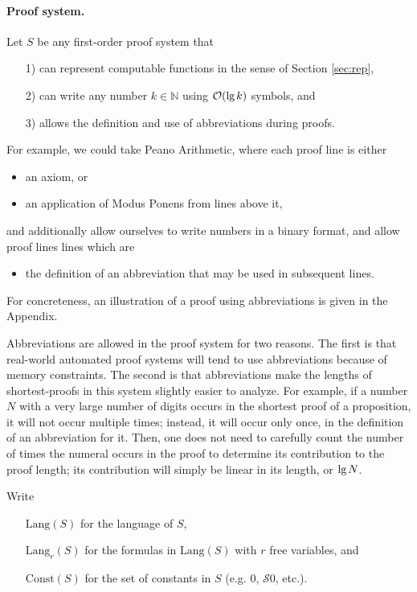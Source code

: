 \documentclass[onecolumn]{miri-tech-article}
\numberwithin{equation}{section}
\theoremstyle{definition}
\newcommand{\NN}{\mathbb{N}}
\newcommand{\Oo}{\mathcal{O}}
\newcommand{\Ss}{\mathcal{S}}
\newcommand{\Lang}{\mathrm{Lang}}
\newcommand{\Const}{\mathrm{Const}}
\renewcommand{\lg}{\mathrm{lg\hspace{0.3ex}}}
\renewcommand{\-}{^{-1}}
\begin{document}
\paragraph{Proof system.}
\label{sec:system}
Let $S$ be any first-order proof system that
\begin{itemize}
\item[1)] can represent computable functions in the sense of Section \ref{sec:rep},
\item[2)] can write any number $k\in\NN$ using $\Oo(\lg k)$ symbols, and 
\item[3)] allows the definition and use of abbreviations during proofs.
\end{itemize}
For example, we could take Peano Arithmetic, where each proof line is either 
\begin{itemize}
\item an axiom, or
\item an application of Modus Ponens from lines above it,
\end{itemize}
and additionally allow ourselves to write numbers in a binary format, and allow proof lines lines which are
\begin{itemize}
\item the definition of an abbreviation that may be used in subsequent lines.
\end{itemize}
For concreteness, an illustration of a proof using abbreviations is given in the Appendix.

\noindent Abbreviations are allowed in the proof system for two reasons.  The first is that real-world automated proof systems will tend to use abbreviations because of memory constraints.  The second is that abbreviations make the lengths of shortest-proofs in this system slightly easier to analyze.  For example, if a number $N$ with a very large number of digits occurs in the shortest proof of a proposition, it will not occur multiple times; instead, it will occur only once, in the definition of an abbreviation for it.  Then, one does not need to carefully count the number of times the numeral occurs in the proof to determine its contribution to the proof length; its contribution will simply be linear in its length, or $\lg N$.

Write 
\begin{itemize}
\item[] $\Lang(S)$ for the language of $S$,
\item[] $\Lang_r(S)$ for the formulas in $\Lang(S)$ with $r$ free variables, and 
\item[] $\Const(S)$ for the set of constants in $S$ (e.g. $0$, $\Ss 0$, etc.).
\end{itemize}
\end{document}
